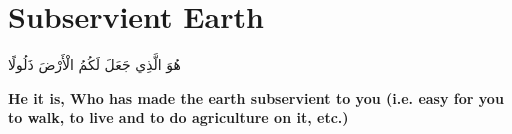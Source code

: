 \chapter{Subservient Earth}
\begin{center}
    {\Huge    
        \begin{Arabic}
            هُوَ الَّذِي جَعَلَ لَكُمُ الْأَرْضَ ذَلُولًا
        \end{Arabic}
    }
\end{center}
\vspace*{\fill}
\vspace{3cm}
\begin{center}
    \large \textbf{He it is, Who has made the earth subservient to you (i.e. easy for you to walk, to live and to do agriculture on it, etc.)}
\end{center}
